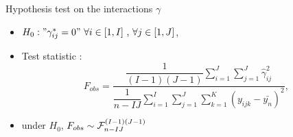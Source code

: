 \documentclass[unknownkeysallowed]{beamer}
\begin{document}
\begin{frame}{Hypothesis test on the interactions $\gamma$ }
\begin{itemize}
    \item $H_0:"\gamma^*_{ij}=0" \text{ } \forall i \in [1,I] \text{ , } \forall j \in [1,J]$,
    \item Test statistic : 
    $$F_{obs}=\dfrac{\dfrac{1}{(I-1)(J-1)} \sum_{i=1}^J \sum_{j=1}^J \hat{\gamma}_{ij}^2}{\dfrac{1}{n-IJ}\sum_{i=1}^I \sum_{j=1}^J \sum_{k=1}^K (y_{ijk}-\bar{y_n})^2 },$$
    \item under $H_0$, $F_{obs} \sim \mathcal{F}^{(I-1)(J-1)}_{n-IJ}$
\end{itemize}
\end{frame}
\end{document}

